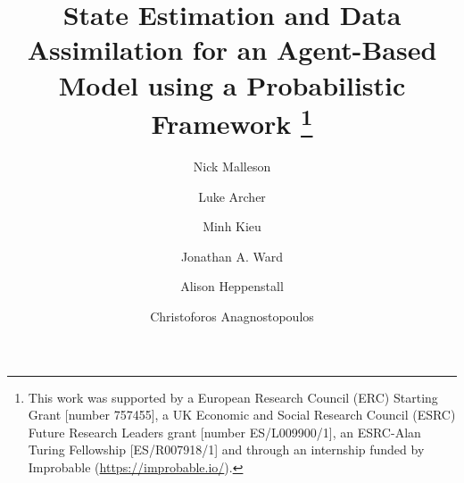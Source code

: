 \documentclass[runningheads]{llncs}
\begin{document}
%
\title{State Estimation and Data Assimilation for an Agent-Based Model using a Probabilistic Framework 
\thanks{This work was supported by a European Research Council (ERC) Starting Grant [number 757455], a UK Economic and Social Research Council (ESRC) Future Research Leaders grant [number ES/L009900/1], an ESRC-Alan Turing Fellowship [ES/R007918/1] and through an internship funded by Improbable (\url{https://improbable.io/}).}}

%
%

\author{Nick Malleson \and
Luke Archer \and
Minh Kieu \and
Jonathan A. Ward \and
Alison Heppenstall \and
Christoforos Anagnostopoulos
}
%
\end{document}
